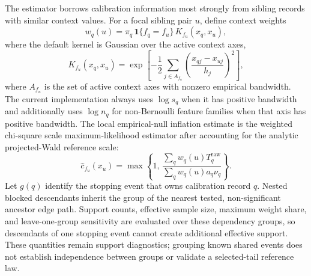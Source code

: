The estimator borrows calibration information most strongly from sibling
records with similar context values. For a focal sibling pair $u$, define
context weights
\begin{equation}
w_q(u)
=
\pi_q\,\mathbf 1\{f_q=f_u\}\,K_{f_u}(x_q,x_u),
\end{equation}
where the default kernel is Gaussian over the active context axes,
\begin{equation}
K_{f_u}(x_q,x_u)
=
\exp\!\left[
-\frac{1}{2}
\sum_{j\in A_{f_u}}
\left(
\frac{x_{qj}-x_{uj}}{h_j}
\right)^2
\right],
\end{equation}
where $A_{f_u}$ is the set of active context axes with nonzero empirical
bandwidth. The current implementation always uses \(\log s_q\) when it has
positive bandwidth and additionally uses \(\log n_q\) for non-Bernoulli
feature families when that axis has positive bandwidth. The local
empirical-null inflation estimate is the weighted
chi-square scale maximum-likelihood estimator after accounting for the analytic
projected-Wald reference scale:
\begin{equation}\label{eq:sibling-context-scale-estimator}
\hat{c}_{f_u}(x_u)
=
\max\left\{
1,\,
\frac{\sum_q w_q(u)T_q^{\mathrm{raw}}}
{\sum_q w_q(u)a_q\nu_q}
\right\}.
\end{equation}
Let $g(q)$ identify the stopping event that owns calibration record $q$.
Nested blocked descendants inherit the group of the nearest tested,
non-significant ancestor edge path. Support counts, effective sample size,
maximum weight share, and leave-one-group sensitivity are evaluated over these
dependency groups, so descendants of one stopping event cannot create
additional effective support. These quantities remain support diagnostics;
grouping known shared events does not establish independence between groups or
validate a selected-tail reference law.

